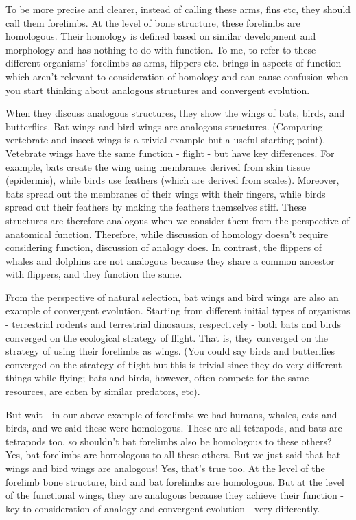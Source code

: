 \documentclass[
]{book}
\begin{document}
To be more precise and clearer, instead of calling these arms, fins etc, they should call them forelimbs. At the level of bone structure, these forelimbs are homologous. Their homology is defined based on similar development and morphology and has nothing to do with function. To me, to refer to these different organisms' forelimbs as arms, flippers etc. brings in aspects of function which aren't relevant to consideration of homology and can cause confusion when you start thinking about analogous structures and convergent evolution.

When they discuss analogous structures, they show the wings of bats, birds, and butterflies. Bat wings and bird wings are analogous structures. (Comparing vertebrate and insect wings is a trivial example but a useful starting point). Vetebrate wings have the same function - flight - but have key differences. For example, bats create the wing using membranes derived from skin tissue (epidermis), while birds use feathers (which are derived from scales). Moreover, bats spread out the membranes of their wings with their fingers, while birds spread out their feathers by making the feathers themselves stiff. These structures are therefore analogous when we consider them from the perspective of anatomical function. Therefore, while discussion of homology doesn't require considering function, discussion of analogy does. In contrast, the flippers of whales and dolphins are not analogous because they share a common ancestor with flippers, and they function the same.

From the perspective of natural selection, bat wings and bird wings are also an example of convergent evolution. Starting from different initial types of organisms - terrestrial rodents and terrestrial dinosaurs, respectively - both bats and birds converged on the ecological strategy of flight. That is, they converged on the strategy of using their forelimbs as wings. (You could say birds and butterflies converged on the strategy of flight but this is trivial since they do very different things while flying; bats and birds, however, often compete for the same resources, are eaten by similar predators, etc).

But wait - in our above example of forelimbs we had humans, whales, cats and birds, and we said these were homologous. These are all tetrapods, and bats are tetrapods too, so shouldn't bat forelimbs also be homologous to these others? Yes, bat forelimbs are homologous to all these others. But we just said that bat wings and bird wings are analogous! Yes, that's true too. At the level of the forelimb bone structure, bird and bat forelimbs are homologous. But at the level of the functional wings, they are analogous because they achieve their function - key to consideration of analogy and convergent evolution - very differently.
\end{document}
